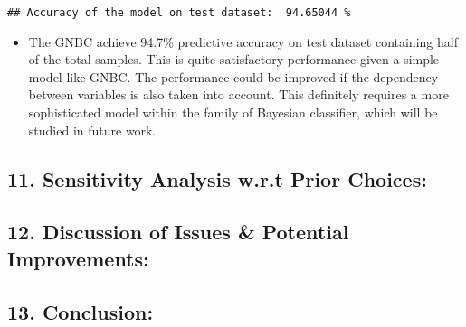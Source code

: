 \documentclass[
]{article}
\providecommand{\tightlist}{%
  \setlength{\itemsep}{0pt}\setlength{\parskip}{0pt}}
\begin{document}
\begin{verbatim}
## Accuracy of the model on test dataset:  94.65044 %
\end{verbatim}

\begin{itemize}
\tightlist
\item
  The GNBC achieve 94.7\% predictive accuracy on test dataset containing
  half of the total samples. This is quite satisfactory performance
  given a simple model like GNBC. The performance could be improved if
  the dependency between variables is also taken into account. This
  definitely requires a more sophisticated model within the family of
  Bayesian classifier, which will be studied in future work.
\end{itemize}

\hypertarget{sensitivity-analysis-w.r.t-prior-choices}{%
\subsection{11. Sensitivity Analysis w.r.t Prior
Choices:}\label{sensitivity-analysis-w.r.t-prior-choices}}

\hypertarget{discussion-of-issues-potential-improvements}{%
\subsection{12. Discussion of Issues \& Potential
Improvements:}\label{discussion-of-issues-potential-improvements}}

\hypertarget{conclusion}{%
\subsection{13. Conclusion:}\label{conclusion}}
\end{document}
